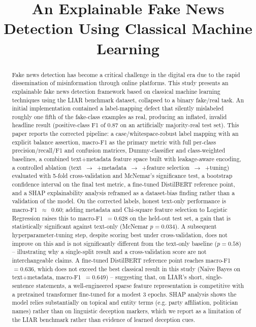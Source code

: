 \documentclass[conference]{IEEEtran}
\begin{document}
\title{An Explainable Fake News Detection Using Classical Machine Learning}

\author{
}

\maketitle

\begin{abstract}
Fake news detection has become a critical challenge in the digital era due to the
rapid dissemination of misinformation through online platforms. This study presents
an explainable fake news detection framework based on classical machine learning
techniques using the LIAR benchmark dataset, collapsed to a binary fake/real task.
An initial implementation contained a label-mapping defect that silently
mislabeled roughly one fifth of the fake-class examples as real, producing an
inflated, invalid headline result (positive-class F1 of 0.87 on an artificially
majority-real test set). This paper reports the corrected pipeline: a
case/whitespace-robust label mapping with an explicit balance assertion, macro-F1
as the primary metric with full per-class precision/recall/F1 and confusion
matrices, Dummy-classifier and class-weighted baselines, a combined text+metadata
feature space built with leakage-aware encoding, a controlled ablation
(text~$\rightarrow$~+metadata~$\rightarrow$~+feature selection~$\rightarrow$~+tuning)
evaluated with 5-fold cross-validation and McNemar's significance test, a bootstrap
confidence interval on the final test metric, a fine-tuned DistilBERT reference
point, and a SHAP explainability analysis reframed as a dataset-bias finding rather
than a validation of the model. On the corrected labels, honest text-only
performance is macro-F1~$\approx$~0.60; adding metadata and Chi-square feature
selection to Logistic Regression raises this to macro-F1~$=0.628$ on the held-out
test set, a gain that is statistically significant against text-only
(McNemar $p=0.034$). A subsequent hyperparameter-tuning step, despite scoring best
under cross-validation, does not improve on this and is not significantly different
from the text-only baseline ($p=0.58$) -- illustrating why a single-split result
and a cross-validation score are not interchangeable claims. A fine-tuned
DistilBERT reference point reaches macro-F1~$=0.636$, which does not exceed the
best classical result in this study (Na\"ive Bayes on text+metadata,
macro-F1~$=0.649$) -- suggesting that, on LIAR's short, single-sentence
statements, a well-engineered sparse feature representation is competitive with a
pretrained transformer fine-tuned for a modest 3 epochs. SHAP analysis shows the
model relies substantially on topical and entity terms (e.g. party affiliation,
politician names) rather than on linguistic deception markers, which we report as a
limitation of the LIAR benchmark rather than evidence of learned deception cues.
\end{abstract}
\end{document}
